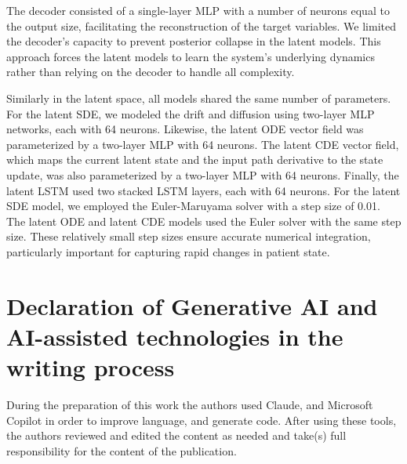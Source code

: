 \documentclass[preprint,12pt]{elsarticle}
\begin{document}
The decoder consisted of a single-layer MLP with a number of neurons equal to the output size, facilitating the reconstruction of the target variables. We limited the decoder's capacity to prevent posterior collapse in the latent models. This approach forces the latent models to learn the system's underlying dynamics rather than relying on the decoder to handle all complexity.

Similarly in the latent space, all models shared the same number of parameters. For the latent SDE, we modeled the drift and diffusion using two-layer MLP networks, each with 64 neurons. Likewise, the latent ODE vector field was parameterized by a two-layer MLP with 64 neurons. The latent CDE vector field, which maps the current latent state and the input path derivative to the state update, was also parameterized by a two-layer MLP with 64 neurons. Finally, the latent LSTM used two stacked LSTM layers, each with 64 neurons. For the latent SDE model, we employed the Euler-Maruyama solver with a step size of 0.01. The latent ODE and latent CDE models used the Euler solver with the same step size. These relatively small step sizes ensure accurate numerical integration, particularly important for capturing rapid changes in patient state.



\section*{Declaration of Generative AI and AI-assisted technologies in the writing process}
During the preparation of this work the authors used Claude, and Microsoft Copilot in order to improve language, and generate code. After using these tools, the authors reviewed and edited the content as needed and take(s) full responsibility for the content of the publication.
 

\end{document}
